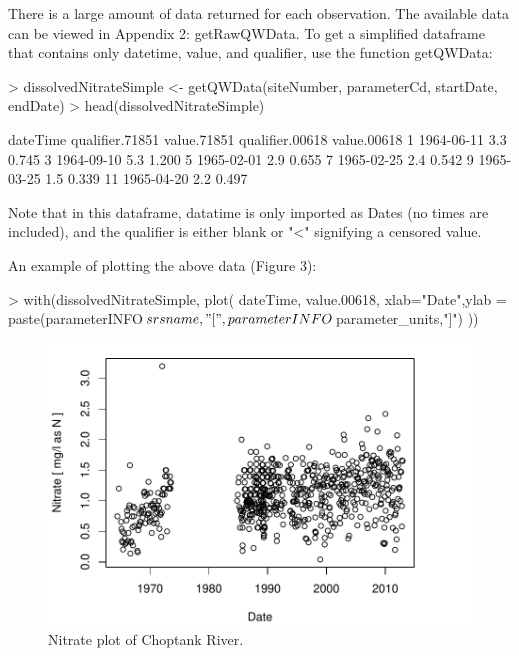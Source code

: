 \documentclass[a4paper,11pt]{article}
\begin{document}
There is a large amount of data returned for each observation. The available data can be viewed in Appendix 2: getRawQWData. To get a simplified dataframe that contains only datetime, value, and qualifier, use the function getQWData:

\begin{Schunk}
\begin{Sinput}
> dissolvedNitrateSimple <- getQWData(siteNumber, parameterCd, startDate, endDate)
> head(dissolvedNitrateSimple)
\end{Sinput}
\begin{Soutput}
     dateTime qualifier.71851 value.71851 qualifier.00618 value.00618
1  1964-06-11                         3.3                       0.745
3  1964-09-10                         5.3                       1.200
5  1965-02-01                         2.9                       0.655
7  1965-02-25                         2.4                       0.542
9  1965-03-25                         1.5                       0.339
11 1965-04-20                         2.2                       0.497
\end{Soutput}
\end{Schunk}
Note that in this dataframe, datatime is only imported as Dates (no times are included), and the qualifier is either blank or "<" signifying a censored value.

An example of plotting the above data (Figure 3):

\begin{Schunk}
\begin{Sinput}
> with(dissolvedNitrateSimple, plot(
   dateTime, value.00618,
   xlab="Date",ylab = paste(parameterINFO$srsname, "[",parameterINFO$parameter_units,"]")
   ))
\end{Sinput}
\end{Schunk}
\newpage

\begin{figure}
\begin{center}
\includegraphics{dataRetrieval-fig3}
\end{center}
\caption{Nitrate plot of Choptank River.}
\end{figure}
\end{document}

